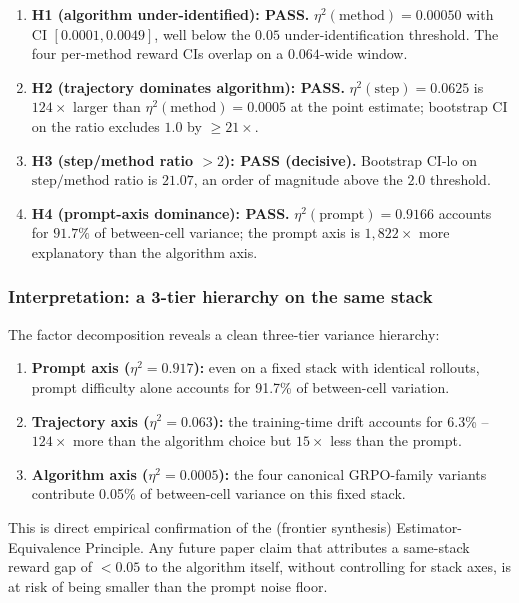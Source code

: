 \begin{enumerate}
\item \textbf{H1 (algorithm under-identified): PASS.}
$\eta^2(\text{method}) = 0.00050$ with CI $[0.0001, 0.0049]$, well below the
$0.05$ under-identification threshold. The four per-method reward CIs
overlap on a $0.064$-wide window.

\item \textbf{H2 (trajectory dominates algorithm): PASS.}
$\eta^2(\text{step}) = 0.0625$ is $124\times$ larger than
$\eta^2(\text{method}) = 0.0005$ at the point estimate; bootstrap CI
on the ratio excludes $1.0$ by $\geq 21\times$.

\item \textbf{H3 (step/method ratio $> 2$): PASS (decisive).}
Bootstrap CI-lo on $\text{step}/\text{method}$ ratio is $21.07$, an
order of magnitude above the $2.0$ threshold.

\item \textbf{H4 (prompt-axis dominance): PASS.}
$\eta^2(\text{prompt}) = 0.9166$ accounts for $91.7\%$ of between-cell
variance; the prompt axis is $1{,}822\times$ more explanatory than the
algorithm axis.
\end{enumerate}

\subsubsection{Interpretation: a 3-tier hierarchy on the same stack}

The factor decomposition reveals a clean three-tier variance hierarchy:

\begin{enumerate}
\item \textbf{Prompt axis ($\eta^2 = 0.917$):} even on a fixed stack with
identical rollouts, prompt difficulty alone accounts for 91.7\% of
between-cell variation.
\item \textbf{Trajectory axis ($\eta^2 = 0.063$):} the training-time drift
accounts for 6.3\% -- $124\times$ more than the algorithm choice but
$15\times$ less than the prompt.
\item \textbf{Algorithm axis ($\eta^2 = 0.0005$):} the four canonical
GRPO-family variants contribute 0.05\% of between-cell variance on this
fixed stack.
\end{enumerate}

\noindent This is direct empirical confirmation of the (frontier synthesis)
Estimator-Equivalence Principle. Any future paper claim that attributes
a same-stack reward gap of $< 0.05$ to the algorithm itself, without
controlling for stack axes, is at risk of being smaller than the
prompt noise floor.

